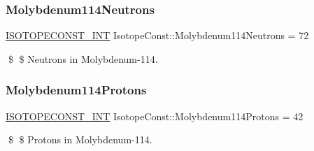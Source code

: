 \subsubsection{\texorpdfstring{Molybdenum114\+Neutrons}{Molybdenum114Neutrons}}
{\footnotesize\ttfamily \mbox{\hyperlink{group___isotope_const-_macros_ga5f18360b3e99483a35c32d789e62621c}{I\+S\+O\+T\+O\+P\+E\+C\+O\+N\+S\+T\+\_\+\+I\+NT}} Isotope\+Const\+::\+Molybdenum114\+Neutrons = 72}

\$ \$ Neutrons in Molybdenum-\/114. \mbox{\label{group___isotope_const-_molybdenum-_mo114_gad852aecb0f7e2493b8fb67f5a88fec74}} 
\subsubsection{\texorpdfstring{Molybdenum114\+Protons}{Molybdenum114Protons}}
{\footnotesize\ttfamily \mbox{\hyperlink{group___isotope_const-_macros_ga5f18360b3e99483a35c32d789e62621c}{I\+S\+O\+T\+O\+P\+E\+C\+O\+N\+S\+T\+\_\+\+I\+NT}} Isotope\+Const\+::\+Molybdenum114\+Protons = 42}

\$ \$ Protons in Molybdenum-\/114. 